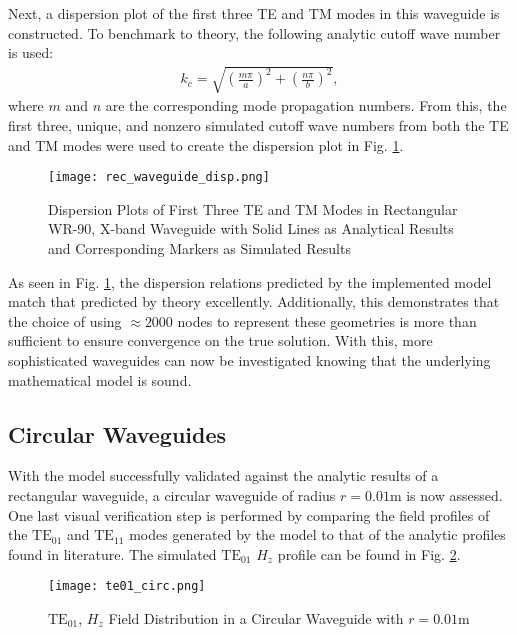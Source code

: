 Next, a dispersion plot of the first three TE and TM modes in this waveguide is constructed. To benchmark to theory, the following analytic cutoff wave number is used:
\begin{align}
    k_c=\sqrt{\left(\frac{m\pi}{a}\right)^2+\left(\frac{n\pi}{b}\right)^2},
\end{align}
where $m$ and $n$ are the corresponding mode propagation numbers. From this, the first three, unique, and nonzero simulated cutoff wave numbers from both the TE and TM modes were used to create the dispersion plot in Fig. \ref{fig:rect_disp}.

\begin{figure}[h!]  
	\centering
	\texttt{[image: rec\_waveguide\_disp.png]} 
	\caption{Dispersion Plots of First Three TE and TM Modes in Rectangular WR-90, X-band Waveguide with Solid Lines as Analytical Results and Corresponding Markers as Simulated Results}
	\label{fig:rect_disp}
\end{figure}

As seen in Fig. \ref{fig:rect_disp}, the dispersion relations predicted by the implemented model match that predicted by theory excellently. Additionally, this demonstrates that the choice of using $\approx2000$ nodes to represent these geometries is more than sufficient to ensure convergence on the true solution. With this, more sophisticated waveguides can now be investigated knowing that the underlying mathematical model is sound.


\subsection{Circular Waveguides}
\label{subsec:circ_guides}
With the model successfully validated against the analytic results of a rectangular waveguide, a circular waveguide of radius $r=0.01$m is now assessed. One last visual verification step is performed by comparing the field profiles of the $\mathrm{TE}_{01}$ and $\mathrm{TE}_{11}$ modes generated by the model to that of the analytic profiles found in literature. The simulated $\mathrm{TE}_{01}$ $H_z$ profile can be found in Fig. \ref{fig:circ_prof}.

\begin{figure}[h!]  
	\centering
	\texttt{[image: te01\_circ.png]} 
	\caption{$\mathrm{TE_{01}}$, $H_z$ Field Distribution in a Circular Waveguide with $r=0.01$m}
	\label{fig:circ_prof}
\end{figure}

